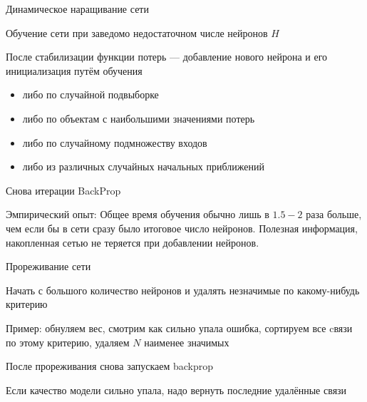 \documentclass[notes,12pt, aspectratio=169]{beamer}
\newenvironment{wideitemize}{\itemize\addtolength{\itemsep}{10pt}}{\enditemize}
\begin{document}
\begin{frame}{Динамическое наращивание сети}
\begin{wideitemize}
\item  Обучение сети при заведомо недостаточном числе нейронов $H$
\item После стабилизации функции потерь — добавление нового нейрона и его инициализация путём обучения 
\begin{itemize}
	\item либо по случайной подвыборке 
	\item либо по объектам с наибольшими значениями потерь 
	\item либо по случайному подмножеству входов
	\item либо из различных случайных начальных приближений
\end{itemize}
\item Снова итерации BackProp
\end{wideitemize}

\vfill
\begin{center}
\alert{Эмпирический опыт:} Общее время обучения обычно лишь в $1.5-2$ раза больше, чем если бы в сети сразу было итоговое число нейронов. Полезная информация, накопленная сетью не теряется при добавлении нейронов.
\end{center}
\end{frame}


\begin{frame}{Прореживание сети}
\begin{wideitemize}
\item Начать с большого количество нейронов и удалять незначимые по какому-нибудь критерию 
\item \alert{Пример:} обнуляем вес, смотрим как сильно упала ошибка, сортируем все cвязи по этому критерию, удаляем $N$ наименее значимых
\item После прореживания снова запускаем backprop
\item Если качество модели сильно упала, надо вернуть последние удалённые связи 
\end{wideitemize}
\end{frame}
\end{document}
